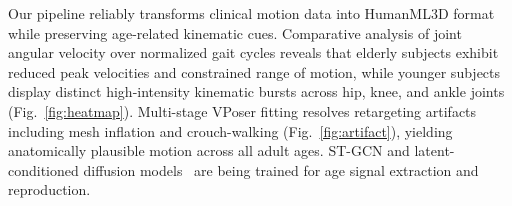 Our pipeline reliably transforms clinical motion data into
HumanML3D format while preserving age-related kinematic
cues. Comparative analysis of joint angular velocity over
normalized gait cycles reveals that elderly subjects exhibit
reduced peak velocities and constrained range of motion,
while younger subjects display distinct high-intensity
kinematic bursts across hip, knee, and ankle
joints (Fig.~\ref{fig:heatmap}). Multi-stage VPoser fitting
resolves retargeting artifacts including mesh inflation and
crouch-walking (Fig.~\ref{fig:artifact}), yielding
anatomically plausible motion across all adult ages.
ST-GCN and latent-conditioned diffusion
models~\cite{chen2022mld, hu2022lora, sawdayee2025dance}
are being trained for age signal extraction and
reproduction.